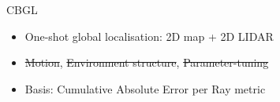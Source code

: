 \begin{frame}{CBGL}

  \begin{itemize}
    \item One-shot global localisation: 2D map + 2D LIDAR
    \item \sout{Motion}, \sout{Environment structure}, \sout{Parameter-tuning}
    \item Basis: Cumulative Absolute Error per Ray metric
  \end{itemize}

\end{frame}
